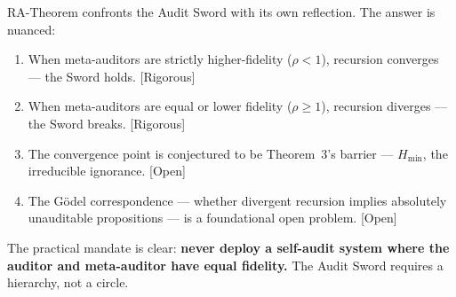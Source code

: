 \documentclass[12pt,a4paper]{article}
\newcommand{\rigorous}{\textcolor{green!50!black}{\small\textsf{[Rigorous]}}}
\newcommand{\openquest}{\textcolor{red!70!black}{\small\textsf{[Open]}}}
\begin{document}
RA-Theorem confronts the Audit Sword with its own reflection.  The answer is
nuanced:
\begin{enumerate}[label=(\arabic*)]
    \item When meta-auditors are strictly higher-fidelity ($\rho<1$), recursion
          converges — the Sword holds.  \rigorous
    \item When meta-auditors are equal or lower fidelity ($\rho\geq1$), recursion
          diverges — the Sword breaks.  \rigorous
    \item The convergence point is conjectured to be Theorem~3's barrier —
          $H_{\min}$, the irreducible ignorance.  \openquest
    \item The G\"odel correspondence — whether divergent recursion implies
          absolutely unauditable propositions — is a foundational open problem.
          \openquest
\end{enumerate}

The practical mandate is clear: \textbf{never deploy a self-audit system where
the auditor and meta-auditor have equal fidelity.}  The Audit Sword requires
a hierarchy, not a circle.
\end{document}
